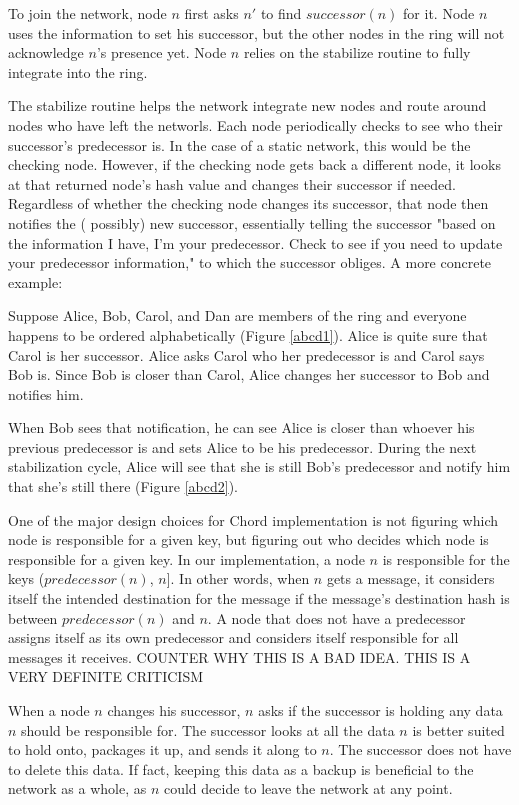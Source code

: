 \documentclass[conference, compsocconf, letterpaper]{IEEEtran}
\begin{document}
To join the network, node $n$ first asks $n'$ to find $successor(n)$ for it.  Node $n$ uses the information to set his successor, but the other nodes in the ring will not acknowledge $n$'s presence yet.  Node $n$ relies on the stabilize routine to fully integrate into the ring.

The stabilize routine helps the network integrate new nodes and route around nodes who have left the networls. Each node periodically checks to see who their successor's predecessor is.  In the case of a static network, this would be the checking node.  However, if the checking node gets back a different node, it looks at that returned node's hash value and changes their successor if needed.  Regardless of whether the checking node changes its successor, that node then notifies the ( possibly) new successor,  essentially telling the successor "based on the information I have, I'm your predecessor.  Check to see if you need to update your predecessor information," to which the successor obliges.  A more concrete example:


Suppose Alice, Bob, Carol, and Dan are members of the ring and everyone happens to be ordered alphabetically (Figure \ref{abcd1}). Alice is quite sure that Carol is her successor.  Alice asks Carol who her predecessor is and Carol says Bob is.  Since Bob is closer than Carol, Alice changes her successor to Bob and notifies him.  

When Bob sees that notification, he can see Alice is closer than whoever his previous predecessor is and sets Alice to be his predecessor.  During the next stabilization cycle, Alice will see that she is still Bob's predecessor and notify him that she's still there (Figure \ref{abcd2}).

One of the major design choices for Chord implementation is not figuring which node is responsible for a given key, but figuring out who decides which node is responsible for a given key.  In our implementation, a node $n$ is responsible for the keys ($predecessor(n)$, $n$].  In other words, when $n$ gets a message, it considers itself the intended destination for the message if the message's destination hash is between $predecessor(n)$ and $n$.  A node that does not have a predecessor assigns itself as its own predecessor and considers itself responsible for all messages it receives.  COUNTER WHY THIS IS A BAD IDEA.  THIS IS A VERY DEFINITE CRITICISM 

When a node $n$ changes his successor, $n$ asks if the successor is holding any data $n$ should be responsible for.  The successor looks at all the data $n$ is better suited to hold onto, packages it up, and sends it along to $n$.  The successor does not have to delete this data. If fact, keeping this data as a backup is beneficial to the network as a whole, as $n$ could decide to leave the network at any point. 
\end{document}
